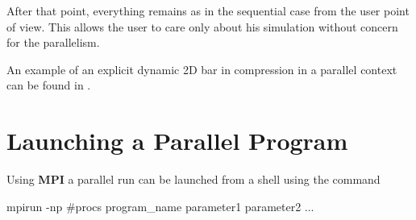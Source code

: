After that point, everything remains as in the sequential case from
the user point of view. This allows the user to care only
about his simulation without concern for the parallelism.

An example of an explicit dynamic 2D bar in compression in a parallel
context can be found in .

\section{Launching a Parallel Program}

Using \textbf{MPI} a parallel run can be launched from a shell
using the command

\begin{cpp}
  mpirun -np #procs program_name parameter1 parameter2 ...
\end{cpp}

